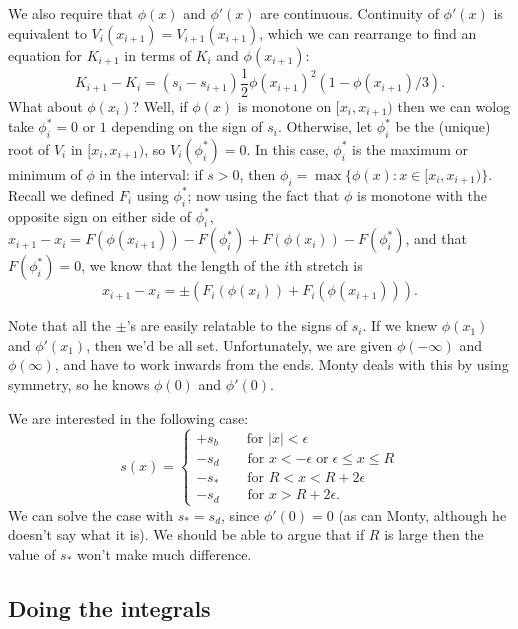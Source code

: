 \documentclass{article}
\begin{document}
We also require that $\phi(x)$ and $\phi'(x)$ are continuous.
Continuity of $\phi'(x)$ is equivalent to $V_i(x_{i+1}) = V_{i+1}(x_{i+1})$,
which we can rearrange to find an equation for $K_{i+1}$ in terms of $K_i$ and $\phi(x_{i+1})$:
\[
    K_{i+1} - K_i = (s_i - s_{i+1}) \frac{1}{2} \phi(x_{i+1})^2 (1-\phi(x_{i+1})/3) .
\]
What about $\phi(x_i)$?  Well, if $\phi(x)$ is monotone on $[x_i,x_{i+1})$ then we can wolog take $\phi_i^*=0$ or $1$ depending on the sign of $s_i$.
Otherwise, let $\phi_i^*$ be the (unique) root of $V_i$ in $[x_i,x_{i+1})$, so $V_i(\phi_i^*)=0$.
In this case, $\phi_i^*$ is the maximum or minimum of $\phi$ in the interval:
if $s>0$, then $\phi_i = \max\{ \phi(x) : x \in [x_i,x_{i+1})\}$. 
Recall we defined $F_i$ using $\phi_i^*$; now using the fact that $\phi$ is monotone with the opposite sign on either side of $\phi_i^*$,
$x_{i+1} - x_i = F(\phi(x_{i+1})) - F(\phi_i^*) + F(\phi(x_{i})) - F(\phi_i^*)$,
and that $F(\phi_i^*) = 0$,
we know that the length of the $i$th stretch is
\[
    x_{i+1} - x_i = \pm \left( F_i(\phi(x_i)) + F_i(\phi(x_{i+1})) \right).
\]

Note that all the $\pm{}$'s are easily relatable to the signs of $s_i$.
If we knew $\phi(x_1)$ and $\phi'(x_1)$, then we'd be all set.
Unfortunately, we are given $\phi(-\infty)$ and $\phi(\infty)$, and have to work inwards from the ends.
Monty deals with this by using symmetry, so he knows $\phi(0)$ and $\phi'(0)$.

We are interested in the following case:
\[
    s(x) = \begin{cases}
        +s_b \qquad \mbox{for } |x|<\epsilon \\
        -s_d \qquad \mbox{for } x<-\epsilon \; \mbox{or}\; \epsilon \le x \le R \\
        -s_* \qquad \mbox{for } R < x < R+2\epsilon \\
        -s_d \qquad \mbox{for } x>R+2\epsilon .
    \end{cases}
\]
We can solve the case with $s_* = s_d$, since $\phi'(0) = 0$ (as can Monty, although he doesn't say what it is).
We should be able to argue that if $R$ is large then the value of $s_*$ won't make much difference.

\subsection{Doing the integrals}
\end{document}

